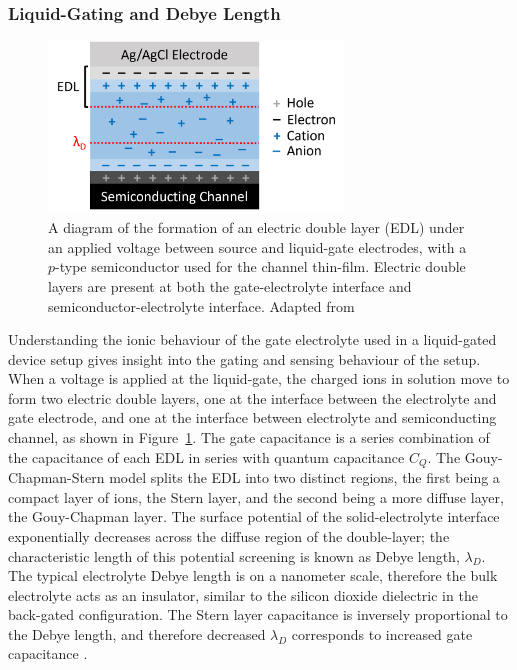 \documentclass[
  a4paper,
]{scrbook}
\begin{document}
\hypertarget{liquid-gating-and-debye-length}{%
\subsubsection*{Liquid-Gating and Debye
Length}\label{liquid-gating-and-debye-length}}

\begin{figure}

{\centering \includegraphics[width=0.7\textwidth,height=\textheight]{figures/ch2/Debye-length-schematic.png}

}

\caption{\label{fig-Debye-length}A diagram of the formation of an
electric double layer (EDL) under an applied voltage between source and
liquid-gate electrodes, with a \(p\)-type semiconductor used for the
channel thin-film. Electric double layers are present at both the
gate-electrolyte interface and semiconductor-electrolyte interface.
Adapted from \autocite{Shkodra2021,Tiwari2022}}

\end{figure}

Understanding the ionic behaviour of the gate electrolyte used in a
liquid-gated device setup gives insight into the gating and sensing
behaviour of the setup. When a voltage is applied at the liquid-gate,
the charged ions in solution move to form two electric double layers,
one at the interface between the electrolyte and gate electrode, and one
at the interface between electrolyte and semiconducting channel, as
shown in Figure~\ref{fig-Debye-length}. The gate capacitance is a series
combination of the capacitance of each EDL in series with quantum
capacitance \(C_{Q}\). The Gouy-Chapman-Stern model splits the EDL into
two distinct regions, the first being a compact layer of ions, the Stern
layer, and the second being a more diffuse layer, the Gouy-Chapman
layer. The surface potential of the solid-electrolyte interface
exponentially decreases across the diffuse region of the double-layer;
the characteristic length of this potential screening is known as Debye
length, \(\lambda_D\). The typical electrolyte Debye length is on a
nanometer scale, therefore the bulk electrolyte acts as an insulator,
similar to the silicon dioxide dielectric in the back-gated
configuration. The Stern layer capacitance is inversely proportional to
the Debye length, and therefore decreased \(\lambda_D\) corresponds to
increased gate capacitance
\autocite{Bard2001,Israelachvili2011,Shkodra2021,Tiwari2022}.
\end{document}
